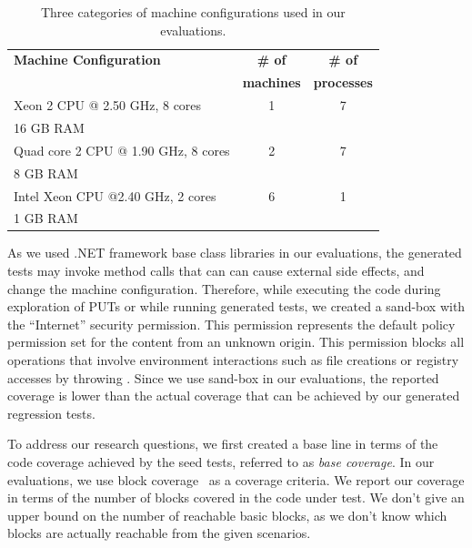 \setlength{\tabcolsep}{1pt}
\begin{table}[t]
\begin{SmallOut}
\begin{CodeOut}
\begin{center}
\begin {tabular} {|l|c|c|}
\hline
\textbf{Machine Configuration} & \textbf{\# of} & \textbf{\# of} \\  
 & \textbf{machines} & \textbf{processes}\\  
\hline
\hline  Xeon 2 CPU @ 2.50 GHz, 8 cores & 1 & 7\\
				16 GB RAM & & \\
\hline  Quad core 2 CPU @ 1.90 GHz, 8 cores& 2 & 7\\
				8 GB RAM & & \\
\hline  Intel Xeon CPU @2.40 GHz, 2 cores& 6 & 1\\
				1 GB RAM & & \\
\hline
\end{tabular}
\end{center}
\end{CodeOut}
\end{SmallOut}\vspace*{-4ex}
\centering \caption {\label{tab:mconfig}Three categories of machine configurations used in our evaluations.}
\end{table}

As we used .NET framework base class libraries in our evaluations, the generated tests may invoke method calls that can can cause external side effects, and change the machine configuration. Therefore, while executing the code during exploration of PUTs or while running generated tests, we created a sand-box with the ``Internet'' security permission. This permission represents the default policy permission set for the content from an unknown origin. This permission blocks all operations that involve environment interactions such as file creations or registry accesses by throwing . Since we use sand-box in our evaluations, the reported coverage is lower than the actual coverage that can be achieved by our generated regression tests.

To address our research questions, we first created a base line in terms of the code coverage achieved by the seed tests, referred to as \emph{base coverage}. In our evaluations, we use block coverage~\cite{} as a coverage criteria. We report our coverage in terms of the number of blocks covered in the code under test. We don't give an upper bound on the number of reachable basic blocks, as we don't know which blocks are actually reachable from the given scenarios.

